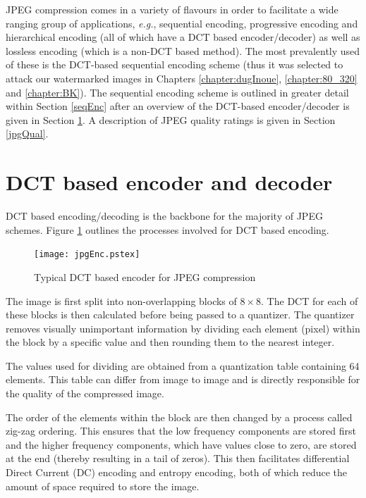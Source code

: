 \documentclass[12pt]{report}
\begin{document}
JPEG compression comes in a variety of flavours in order to facilitate a 
wide ranging group of applications, \emph{e.g.}, sequential encoding,
progressive encoding and hierarchical encoding (all of which have a 
DCT based encoder/decoder) as well as lossless encoding (which is a non-DCT
based method).
The most prevalently used of these is the DCT-based sequential encoding scheme
(thus it was selected to attack our watermarked images in Chapters \ref{chapter:dugInoue},
\ref{chapter:80_320} and \ref{chapter:BK}).
The sequential encoding scheme is outlined in greater detail within Section \ref{seqEnc}
after an overview of the DCT-based encoder/decoder is given in Section \ref{DCTencDec}.
A description of JPEG quality ratings is given in Section \ref{jpgQual}.

\section{DCT based encoder and decoder}
\label{DCTencDec}
DCT based encoding/decoding is the backbone for the majority of JPEG
schemes. 
Figure \ref{jpgEnc} outlines the processes involved for DCT based encoding.

\begin{figure}[htb]
	\begin{center}
		\texttt{[image: jpgEnc.pstex]}
		\caption{Typical DCT based encoder for JPEG compression}
		\label{jpgEnc}
	\end{center}
\end{figure}

The image is first split into non-overlapping blocks of $8 \times 8$.
The DCT for each of these blocks is then calculated before being passed
to a quantizer. The quantizer removes visually unimportant information 
by dividing each element (pixel) within the block by a specific value and then rounding
them to the nearest integer.

The values used for dividing are obtained from a quantization table containing 64
elements. This table can differ from image to image and is directly 
responsible for the quality of the compressed image.

The order of the elements within the block are then changed by a process called
zig-zag ordering. This ensures that the low frequency components are stored first
and the higher frequency components, which have values close to zero, are 
stored at the end (thereby resulting in a tail of zeros). This then facilitates
differential Direct Current (DC) encoding and entropy encoding, both of which reduce the amount of 
space required to store the image.
\end{document}
